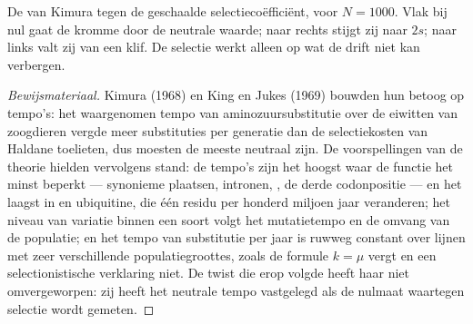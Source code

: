 \begin{omfigure}

{\small De  van Kimura tegen de geschaalde
selectiecoëfficiënt, voor $N = 1000$. Vlak bij nul gaat de kromme door
de neutrale waarde; naar rechts stijgt zij naar $2s$; naar links valt
zij van een klif. De selectie werkt alleen op wat de drift niet kan
verbergen.}
\end{omfigure}

\begin{proof}[Bewijsmateriaal]
Kimura (1968) en King en Jukes (1969) bouwden hun betoog op tempo's:
het waargenomen tempo van aminozuursubstitutie over de eiwitten van
zoogdieren vergde meer substituties per generatie dan de selectiekosten
van Haldane toelieten, dus moesten de meeste neutraal zijn. De
voorspellingen van de theorie hielden vervolgens stand: de tempo's zijn
het hoogst waar de functie het minst beperkt --- synonieme plaatsen,
intronen, , de derde codonpositie --- en het laagst in
 en ubiquitine, die één residu per honderd miljoen jaar
veranderen; het niveau van variatie binnen een soort volgt het
mutatietempo en de omvang van de populatie; en het tempo van
substitutie per jaar is ruwweg constant over lijnen met zeer
verschillende populatiegroottes, zoals de formule $k = \mu$ vergt en
een selectionistische verklaring niet. De twist die erop volgde heeft
haar niet omvergeworpen: zij heeft het neutrale tempo vastgelegd als de
nulmaat waartegen selectie wordt gemeten.
\end{proof}

